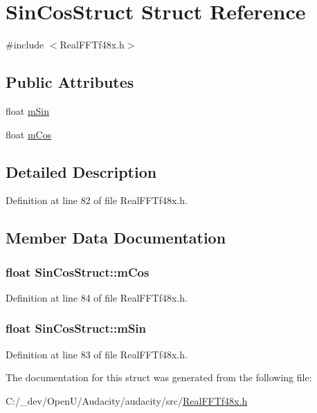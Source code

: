 \hypertarget{struct_sin_cos_struct}{}\section{Sin\+Cos\+Struct Struct Reference}
\label{struct_sin_cos_struct}


{\ttfamily \#include $<$Real\+F\+F\+Tf48x.\+h$>$}

\subsection*{Public Attributes}
\begin{DoxyCompactItemize}
\item 
float \hyperlink{struct_sin_cos_struct_a082d581505f7cdaa747ea9d1180db9ae}{m\+Sin}
\item 
float \hyperlink{struct_sin_cos_struct_aa41f3170467f3052c783c1c9d37ecdea}{m\+Cos}
\end{DoxyCompactItemize}


\subsection{Detailed Description}


Definition at line 82 of file Real\+F\+F\+Tf48x.\+h.



\subsection{Member Data Documentation}
\subsubsection[{\texorpdfstring{m\+Cos}{mCos}}]{\setlength{\rightskip}{0pt plus 5cm}float Sin\+Cos\+Struct\+::m\+Cos}\hypertarget{struct_sin_cos_struct_aa41f3170467f3052c783c1c9d37ecdea}{}\label{struct_sin_cos_struct_aa41f3170467f3052c783c1c9d37ecdea}


Definition at line 84 of file Real\+F\+F\+Tf48x.\+h.

\subsubsection[{\texorpdfstring{m\+Sin}{mSin}}]{\setlength{\rightskip}{0pt plus 5cm}float Sin\+Cos\+Struct\+::m\+Sin}\hypertarget{struct_sin_cos_struct_a082d581505f7cdaa747ea9d1180db9ae}{}\label{struct_sin_cos_struct_a082d581505f7cdaa747ea9d1180db9ae}


Definition at line 83 of file Real\+F\+F\+Tf48x.\+h.



The documentation for this struct was generated from the following file\+:\begin{DoxyCompactItemize}
\item 
C\+:/\+\_\+dev/\+Open\+U/\+Audacity/audacity/src/\hyperlink{_real_f_f_tf48x_8h}{Real\+F\+F\+Tf48x.\+h}\end{DoxyCompactItemize}
